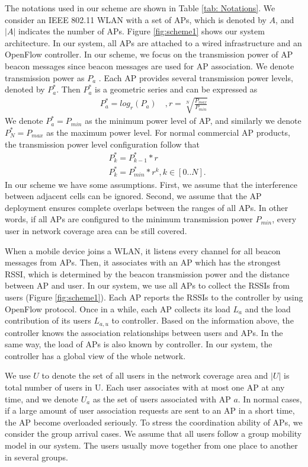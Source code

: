 The notations used in our scheme are shown in Table \ref{tab: Notations}. We consider an IEEE 802.11 WLAN with a set of APs, which is denoted by $A$, and $|A|$ indicates the number of APs. 
Figure \ref{fig:scheme1} shows our system architecture. 
In our system, all APs are attached to a wired infrastructure and an OpenFlow controller. 
In our scheme, we focus on the transmission power of AP beacon messages since beacon messages are used for AP association.
We denote transmission power as $P_a$  . Each AP provides several transmission power levels, denoted by $P_a^*$. 
Then $P_a^*$ is a geometric series and can be expressed as
\begin{eqnarray}
{P_a^*}=log _r⁡\left({P_a} \right)  \quad,r=\sqrt[N]{\frac{P_{max}}{P_{min}}}
\end{eqnarray}
We denote $P_a^*=P_{min}$ as the minimum power level of AP, and similarly we denote $P_N^*=P_{max}$ as the maximum power level. For normal commercial AP products, the transmission power level configuration follow that
\begin{align}
&P_k^*={P_{k-1}^*}*r\\										
&P_k^*={P_{min}^*}*{r^k}, k\in[0..N].							
\end{align}
In our scheme we have some assumptions. First, we assume that the interference between adjacent cells can be ignored. Second, we assume that the AP deployment ensures complete overlaps between the ranges of all APs. In other words, if all APs are configured to the minimum transmission power $P_{min}$, every user in network coverage area can be still covered.

When a mobile device joins a WLAN, it listens every channel for all beacon messages from APs. Then, it associates with an AP which has the strongest RSSI, which is determined by the beacon transmission power and the distance between AP and user. In our system, we use all APs to collect the RSSIs from users  (Figure \ref{fig:scheme1}). Each AP reports the RSSIs to the controller by using OpenFlow protocol. Once in a while, each AP collects its load $L_a$  and the load contribution of its users $L_{a,u}$  to controller. Based on the information above, the controller knows the association relationships between users and APs. In the same way, the load of APs is also known by controller. In our system, the controller has a global view of the whole network.

We use $U$ to denote the set of all users in the network coverage area and $|U|$ is total number of users in U. Each user associates with at most one AP at any time, and we denote $U_a$ as the set of users associated with AP $a$. In normal cases, if a large amount of user association requests are sent to an AP in a short time, the AP become overloaded seriously. To stress the coordination ability of APs, we consider the group arrival cases. We assume that all users follow a group mobility model in our system. The users usually move together from one place to another in several groups.


